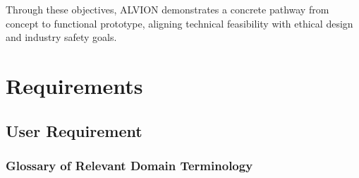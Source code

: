 \documentclass[11pt]{report}
\begin{document}
Through these objectives, ALVION demonstrates a concrete pathway from concept to functional prototype, aligning technical feasibility with ethical design and industry safety goals.
\clearpage


\chapter{Requirements}
\section{User Requirement}
\subsection{Glossary of Relevant Domain Terminology}
\end{document}
